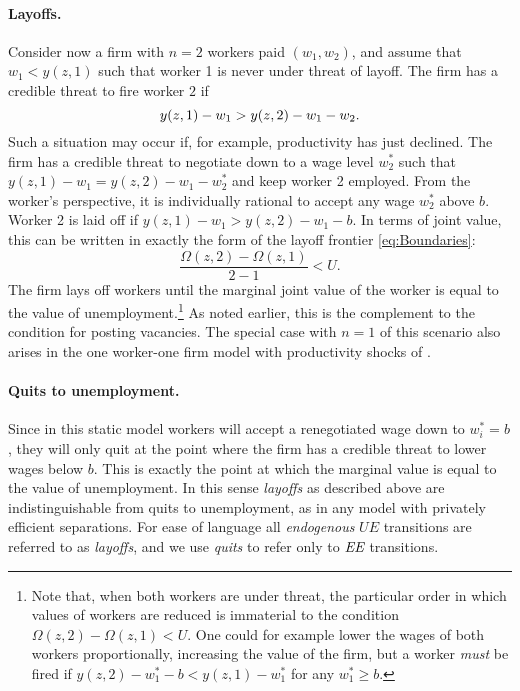 \vspace*{-.2cm}\paragraph{Layoffs.}
Consider now a firm with $n=2$ workers paid $(w_1,w_2)$, and assume that $w_{1}<y(z,1)$ such that worker 1 is never under threat of layoff.
The firm has a credible threat to fire worker $2$ if
\vspace*{-.3cm}\begin{equation*}
y(z,1) - w_1 > y(z,2)-w_1-w_2.
\vspace*{-.3cm}\end{equation*}
Such a situation may occur if, for example, productivity has just declined. The firm has a credible threat to negotiate down to a wage level $w_2^\ast$ such that 
$y(z,1) - w_1 = y(z,2) - w_1 - w_2^\ast$ and keep worker 2 employed.
From the worker's perspective, it is individually rational to accept any wage $w_2^\ast$ above $b$. Worker 2 is laid off if $y(z,1) - w_1>y(z,2) - w_1 -b$. In terms of joint value, this can be written in exactly the form of the layoff frontier \eqref{eq:Boundaries}:
\vspace*{-.2cm}\begin{equation*}
\frac{\Omega \left( z,2\right) -\Omega \left( z,1\right)}{2-1} < U.
\end{equation*}
The firm lays off workers until the marginal joint value of the worker is equal to the value of unemployment.\footnote{
    Note that, when both workers are under threat, the particular order in which values of workers are reduced is immaterial to the condition $\Omega \left( z,2\right) -\Omega \left(z,1\right) < U$.
    One could for example lower the wages of both workers proportionally, increasing the value of the firm, but a worker \emph{must} be fired if $y(z,2)-w_1^{\ast}-b < y(z,1)-w_1^{\ast}$ for any $w_1^{\ast}\geq b$.}
As noted earlier, this is the complement to the condition for posting vacancies. The special case with $n=1$ of this scenario also arises in the one worker-one firm model with productivity shocks of \citet{pvtearnings2010}.

\vspace*{-.2cm}\paragraph{Quits to unemployment.}
Since in this static model workers will accept a renegotiated wage down to $w_i^\ast=b$, they will only quit at the point where the firm has a credible threat to lower wages below $b$. This is exactly the point at which the marginal value is equal to the value of unemployment. In this sense \emph{layoffs} as described above are indistinguishable from quits to unemployment, as in any model with privately efficient separations. For ease of language all \emph{endogenous} $UE$ transitions are referred to as \emph{layoffs}, and we use \emph{quits} to refer only to $\emph{EE}$ transitions.

